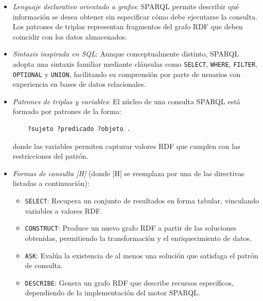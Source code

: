 \documentclass{article}
\begin{document}
\begin{itemize}
    \item \textit{Lenguaje declarativo orientado a grafos}:  
    SPARQL permite describir qué información se desea obtener sin especificar cómo debe ejecutarse la consulta. Los patrones de triplas representan fragmentos del grafo RDF que deben coincidir con los datos almacenados.

    \item \textit{Sintaxis inspirada en SQL}:  
    Aunque conceptualmente distinto, SPARQL adopta una sintaxis familiar mediante cláusulas como \texttt{SELECT}, \texttt{WHERE}, \texttt{FILTER}, \texttt{OPTIONAL} y \texttt{UNION}, facilitando su comprensión por parte de usuarios con experiencia en bases de datos relacionales.

    \item \textit{Patrones de triplas y variables}:  
    El núcleo de una consulta SPARQL está formado por patrones de la forma:
    \begin{verbatim}
    ?sujeto ?predicado ?objeto .
    \end{verbatim}
    donde las variables permiten capturar valores RDF que cumplen con las restricciones del patrón.

   \item \textit{Formas de consulta [H]} (donde [H] se reemplaza por una de las directivas listadas a continuación):
    \begin{itemize}
        \item \texttt{SELECT}: Recupera un conjunto de resultados en forma tabular, vinculando variables a valores RDF.
        \item \texttt{CONSTRUCT}: Produce un nuevo grafo RDF a partir de las soluciones obtenidas, permitiendo la transformación y el enriquecimiento de datos.
        \item \texttt{ASK}: Evalúa la existencia de al menos una solución que satisfaga el patrón de consulta.
        \item \texttt{DESCRIBE}: Genera un grafo RDF que describe recursos específicos, dependiendo de la implementación del motor SPARQL.
    \end{itemize}


\end{itemize}
\end{document}
